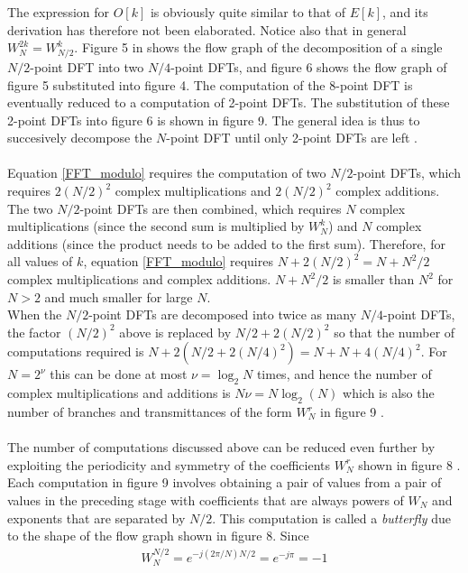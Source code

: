 The expression for $O[k]$ is obviously quite similar to that of $E[k]$, and its derivation has therefore not been elaborated. Notice also that in general $W_N^{2k} = W_{N/2}^k$. Figure 5 in \cite{page 760, DTSP} shows the flow graph of the decomposition of a single $N/2$-point DFT into two $N/4$-point DFTs, and figure 6 shows the flow graph of figure 5 substituted  into figure 4. The computation of the 8-point DFT is eventually reduced to a computation of  2-point DFTs. The substitution of these 2-point DFTs into figure 6 is shown in figure 9. The general idea is thus to succesively decompose the $N$-point DFT until only 2-point DFTs are left .
\\ \\
Equation \eqref{FFT_modulo} requires the computation of two $N/2$-point DFTs, which requires $2(N/2)^2$ complex multiplications and $2(N/2)^2$ complex additions. The two $N/2$-point DFTs are then combined, which requires $N$ complex multiplications (since the second sum is multiplied by $W_N^k$) and $N$ complex additions (since the product needs to be added to the first sum). Therefore, for all values of $k$, equation \eqref{FFT_modulo} requires $N + 2(N/2)^2 = N + N^2/2$ complex multiplications and complex additions. $N + N^2/2$ is smaller than $N^2$ for $N > 2$ and much smaller for large $N$.
\\
When the $N/2$-point DFTs are decomposed into twice as many $N/4$-point DFTs, the factor $(N/2)^2$ above is replaced by $N/2 + 2(N/2)^2$ so that the number of computations required is $N + 2(N/2+2(N/4)^2) = N + N + 4(N/4)^2$. For $N = 2^\nu$ this can be done at most $\nu = \log_2 N$ times, and hence the number of complex multiplications and additions is $N \nu = N \log_2 (N)$ which is also the number of branches and transmittances of the form $W_N^r$ in figure 9 .
\\ \\
The number of computations discussed above can be reduced even further by exploiting the periodicity and symmetry of the coefficients $W_N^r$ shown in figure 8 \cite{DTSP}. Each computation in figure 9 involves obtaining a pair of values from a pair of values in the preceding stage with coefficients that are always powers of $W_N$ and exponents that are separated by $N/2$. This computation is called a \textit{butterfly} due to the shape of the flow graph shown in figure 8. Since 
\begin{align*}
W_N^{N/2} = e^{-j(2\pi/N)N/2} = e^{-j\pi} = -1
\end{align*}

